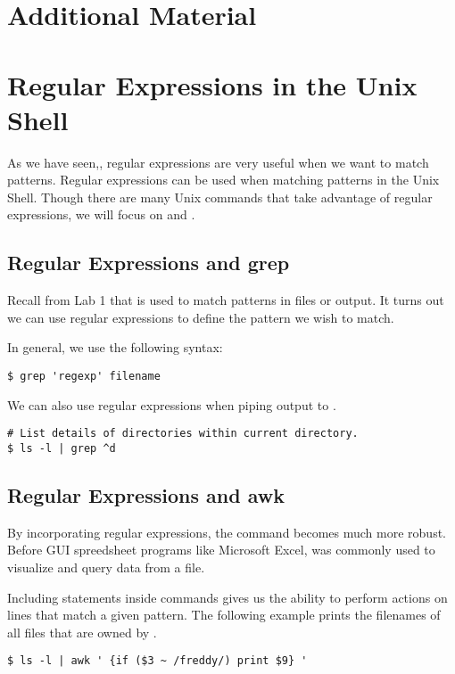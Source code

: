 \newpage

\section*{Additional Material} %

\section*{Regular Expressions in the Unix Shell}
As we have seen,, regular expressions are very useful when we want to match patterns.
Regular expressions can be used when matching patterns in the Unix Shell.
Though there are many Unix commands that take advantage of regular expressions, we will focus on  and .

\subsection*{Regular Expressions and grep}
Recall from Lab 1 that  is used to match patterns in files or output.
It turns out we can use regular expressions to define the pattern we wish to match.

In general, we use the following syntax:
\begin{lstlisting}
$ grep 'regexp' filename
\end{lstlisting}

We can also use regular expressions when piping output to .
\begin{lstlisting}
# List details of directories within current directory.
$ ls -l | grep ^d
\end{lstlisting}

\subsection*{Regular Expressions and awk}
By incorporating regular expressions, the  command becomes much more robust.
Before GUI spreedsheet programs like Microsoft Excel,  was commonly used to visualize and query data from a file.

Including  statements inside  commands gives us the ability to perform actions on lines that match a given pattern.
The following example prints the filenames of all files that are owned by .
\begin{lstlisting}
$ ls -l | awk ' {if ($3 ~ /freddy/) print $9} '
\end{lstlisting}

